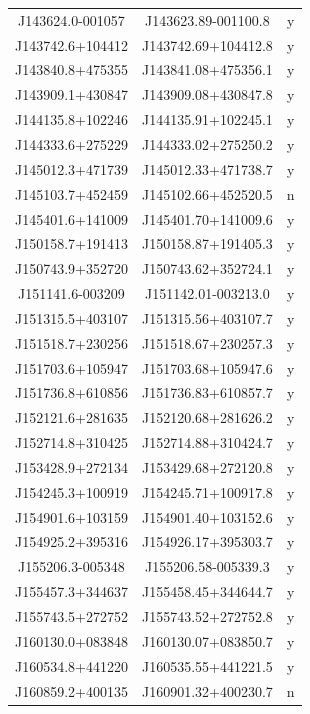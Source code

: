 \begin{table}
\begin{tabular}{ccc}
        J143624.0-001057 & J143623.89-001100.8 & y\\
        J143742.6+104412 & J143742.69+104412.8 & y\\
        J143840.8+475355 & J143841.08+475356.1 & y\\
        J143909.1+430847 & J143909.08+430847.8 & y\\
        J144135.8+102246 & J144135.91+102245.1 & y\\
        J144333.6+275229 & J144333.02+275250.2 & y\\
        J145012.3+471739 & J145012.33+471738.7 & y\\
        J145103.7+452459 & J145102.66+452520.5 & n\\
        J145401.6+141009 & J145401.70+141009.6 & y\\
        J150158.7+191413 & J150158.87+191405.3 & y\\
        J150743.9+352720 & J150743.62+352724.1 & y\\
        J151141.6-003209 & J151142.01-003213.0 & y\\
        J151315.5+403107 & J151315.56+403107.7 & y\\
        J151518.7+230256 & J151518.67+230257.3 & y\\
        J151703.6+105947 & J151703.68+105947.6 & y\\
        J151736.8+610856 & J151736.83+610857.7 & y\\
        J152121.6+281635 & J152120.68+281626.2 & y\\
        J152714.8+310425 & J152714.88+310424.7 & y\\
        J153428.9+272134 & J153429.68+272120.8 & y\\
        J154245.3+100919 & J154245.71+100917.8 & y\\
        J154901.6+103159 & J154901.40+103152.6 & y\\
        J154925.2+395316 & J154926.17+395303.7 & y\\
        J155206.3-005348 & J155206.58-005339.3 & y\\
        J155457.3+344637 & J155458.45+344644.7 & y\\
        J155743.5+272752 & J155743.52+272752.8 & y\\
        J160130.0+083848 & J160130.07+083850.7 & y\\
        J160534.8+441220 & J160535.55+441221.5 & y\\
        J160859.2+400135 & J160901.32+400230.7 & n\\

\end{tabular}
\end{table}
